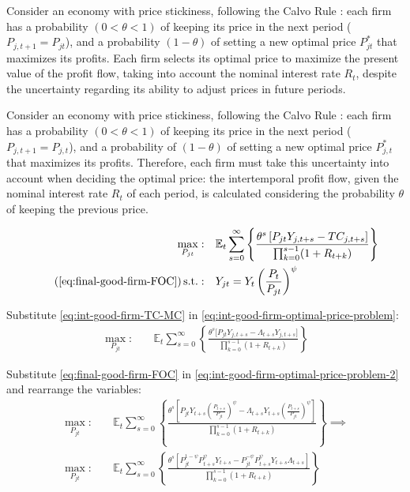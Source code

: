 \documentclass[
	12pt, 
	]{article}
\numberwithin{equation}{section}
\DeclareMathOperator{\st}{s.t.}
\newcommand{\E}[1][t]{{\mathbb{E}_{#1}}}
\theoremstyle{definition}
\theoremstyle{plain}
\theoremstyle{plain}
\theoremstyle{plain}
\begin{document}
Consider an economy with price stickiness, following the Calvo Rule \cite{calvo_staggered_1983}: each firm has a probability $(0 < \theta < 1)$ of keeping its price in the next period ($P_{j,t+1} = P_{jt}$), and a probability $(1 - \theta)$ of setting a new optimal price $P_{jt}^\ast$ that maximizes its profits. Each firm selects its optimal price to maximize the present value of the profit flow, taking into account the nominal interest rate $R_t$, despite the uncertainty regarding its ability to adjust prices in future periods.


Consider an economy with price stickiness, following the Calvo Rule \cite{calvo_staggered_1983}: each firm has a probability $(0 < \theta < 1)$ of keeping its price in the next period ($P_{j,t+1} = P_{j,t}$), and a probability of $(1 - \theta)$ of setting a new optimal price $P_{j,t}^\ast$ that maximizes its profits. Therefore, each firm must take this uncertainty into account when deciding the optimal price: the intertemporal profit flow, given the nominal interest rate $R_t$ of each period, is calculated considering the probability $\theta$ of keeping the previous price.



\begin{align}
\label{eq:int-good-firm-optimal-price-problem}
	\max_{P_{jt}}: & \quad \E \sum_{s=0}^{\infty} \left\{ \frac{ \theta^s \left[ P_{jt} Y_{j,t+s} - TC_{j,t+s} \right] }{\prod_{k=0}^{s-1}(1+R_{t+k})} \right\} \\
\tag{\ref{eq:final-good-firm-FOC}}
	\st: & \quad Y_{jt} = Y_t \left( \frac{P_t}{P_{jt}} \right)^{\psi}
\end{align}


Substitute \ref{eq:int-good-firm-TC-MC} in \ref{eq:int-good-firm-optimal-price-problem}:
\begin{align}
\label{eq:int-good-firm-optimal-price-problem-2}
	\max_{P_{jt}}: & \quad \E \sum_{s=0}^{\infty} \left\{ \frac{\theta^s \big[ P_{jt} Y_{j,t+s} - \Lambda_{t+s} Y_{j,t+s} \big]}{\prod_{k=0}^{s-1}(1+R_{t+k})} \right\}
\end{align}

Substitute \ref{eq:final-good-firm-FOC} in \ref{eq:int-good-firm-optimal-price-problem-2} and rearrange the variables:
\begin{align}
	\max_{P_{jt}}: & \quad \E \sum_{s=0}^{\infty} \left\{ \frac{\theta^s \left[ P_{jt} Y_{t+s} \left( \frac{P_{t+s}}{P_{jt}} \right)^{\psi} - \Lambda_{t+s} Y_{t+s} \left( \frac{P_{t+s}}{P_{jt}} \right)^{\psi} \right] }{\prod_{k=0}^{s-1}(1+R_{t+k})} \right\} \implies \nonumber 
\\
	\max_{P_{jt}}: & \quad \E \sum_{s=0}^{\infty} \left\{ \frac{\theta^s \left[ P_{jt}^{1-\psi} P_{t+s}^{\psi} Y_{t+s} - P_{jt}^{-\psi} P_{t+s}^{\psi} Y_{t+s} \Lambda_{t+s} \right] }{\prod_{k=0}^{s-1}(1+R_{t+k})} \right\} \nonumber
\end{align}
\end{document}
